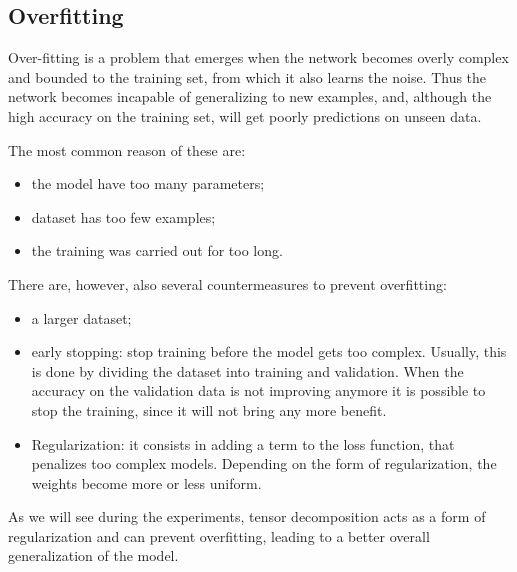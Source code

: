 \subsection{Overfitting}
Over-fitting is a problem that emerges when the network becomes overly complex and bounded to the training set, from which it also learns the noise. Thus the network becomes incapable of generalizing to new examples, and, although the high accuracy on the training set, will get poorly predictions on unseen data.

The most common reason of these are: 
	\begin{itemize}
	   \item the model have too many parameters;
	   \item dataset has too few examples;
	   \item the training was carried out for too long. 
	\end{itemize}

There are, however, also several countermeasures to prevent overfitting: 
\begin{itemize}
   \item a larger dataset;
   \item early stopping: stop training before the model gets too complex. Usually, this is done by dividing the dataset into training and validation. When the accuracy on the validation data is not improving anymore it is possible to stop the training, since it will not bring any more benefit. 
   \item Regularization: it consists in adding a term to the loss function, that penalizes too complex models. Depending on the form of regularization, the weights become more or less uniform.
   
\end{itemize}

As we will see during the experiments, tensor decomposition acts as a form of regularization and can prevent overfitting, leading to a better overall generalization of the model. 





